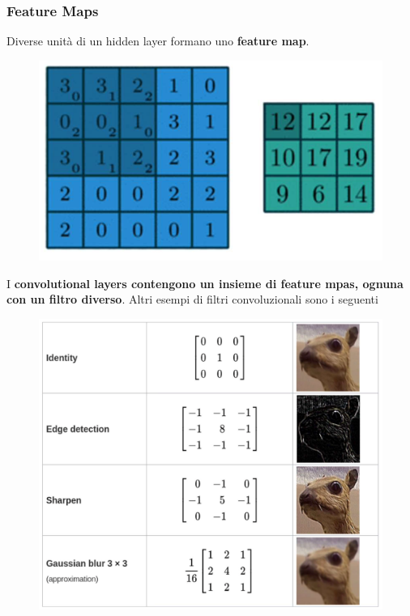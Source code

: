 \subsubsection{Feature Maps}
Diverse unità di un hidden layer formano uno \textbf{feature map}.
\begin{figure}[!h]
    \includegraphics[scale=.5]{images/cnn/feature_maps.png}
    \centering
\end{figure}


I \textbf{convolutional layers contengono un insieme di feature mpas, ognuna con un filtro diverso}.
\newline
\newline
Altri esempi di filtri convoluzionali sono i seguenti
\begin{figure}[!h]
    \includegraphics[scale=.7]{images/cnn/conv_filter_ex.png}
    \centering
\end{figure}
\newpage
